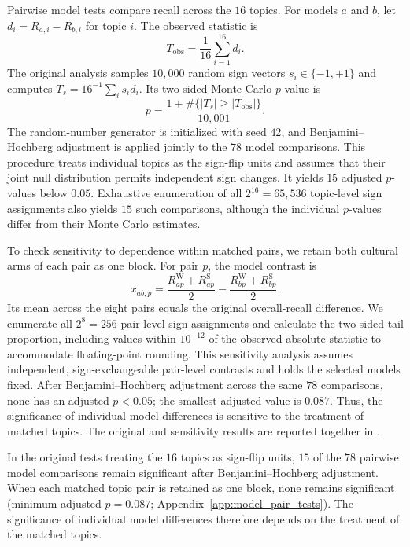 
Pairwise model tests compare recall across the $16$ topics. For models $a$ and $b$, let $d_i=R_{a,i}-R_{b,i}$ for topic $i$. The observed statistic is
\[
T_{\mathrm{obs}}=\frac{1}{16}\sum_{i=1}^{16}d_i.
\]
The original analysis samples $10{,}000$ random sign vectors $s_i\in\{-1,+1\}$ and computes $T_s=16^{-1}\sum_i s_i d_i$. Its two-sided Monte Carlo $p$-value is
\[
p=\frac{1+\#\{|T_s|\geq|T_{\mathrm{obs}}|\}}{10{,}001}.
\]
The random-number generator is initialized with seed $42$, and Benjamini--Hochberg adjustment is applied jointly to the $78$ model comparisons. This procedure treats individual topics as the sign-flip units and assumes that their joint null distribution permits independent sign changes. It yields $15$ adjusted $p$-values below $0.05$. Exhaustive enumeration of all $2^{16}=65{,}536$ topic-level sign assignments also yields $15$ such comparisons, although the individual $p$-values differ from their Monte Carlo estimates.

To check sensitivity to dependence within matched pairs, we retain both cultural arms of each pair as one block. For pair $p$, the model contrast is
\[
x_{ab,p}=\frac{R^{\mathrm W}_{ap}+R^{\mathrm S}_{ap}}{2}
         -\frac{R^{\mathrm W}_{bp}+R^{\mathrm S}_{bp}}{2}.
\]
Its mean across the eight pairs equals the original overall-recall difference. We enumerate all $2^8=256$ pair-level sign assignments and calculate the two-sided tail proportion, including values within $10^{-12}$ of the observed absolute statistic to accommodate floating-point rounding. This sensitivity analysis assumes independent, sign-exchangeable pair-level contrasts and holds the selected models fixed. After Benjamini--Hochberg adjustment across the same $78$ comparisons, none has an adjusted $p<0.05$; the smallest adjusted value is $0.087$. Thus, the significance of individual model differences is sensitive to the treatment of matched topics. The original and sensitivity results are reported together in .

In the original tests treating the $16$ topics as sign-flip units, $15$ of the $78$ pairwise model comparisons remain significant after Benjamini--Hochberg adjustment. When each matched topic pair is retained as one block, none remains significant (minimum adjusted $p=0.087$; Appendix~\ref{app:model_pair_tests}). The significance of individual model differences therefore depends on the treatment of the matched topics.

